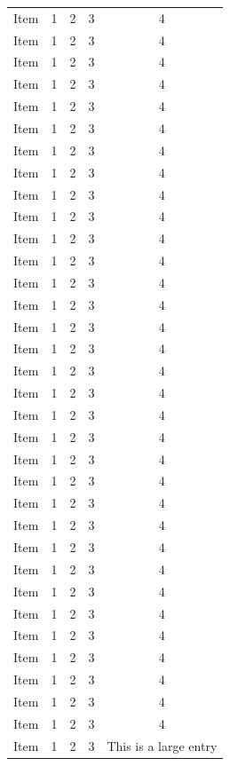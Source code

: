 \documentclass{article}
\begin{document}
\begin{longtable}[c]{|*{5}{c|}}
		Item & 1 & 2 & 3 & 4 \\
		Item & 1 & 2 & 3 & 4 \\
		Item & 1 & 2 & 3 & 4 \\
		Item & 1 & 2 & 3 & 4 \\
		Item & 1 & 2 & 3 & 4 \\
		Item & 1 & 2 & 3 & 4 \\
		Item & 1 & 2 & 3 & 4 \\
		Item & 1 & 2 & 3 & 4 \\
		Item & 1 & 2 & 3 & 4 \\
		Item & 1 & 2 & 3 & 4 \\
		Item & 1 & 2 & 3 & 4 \\
		Item & 1 & 2 & 3 & 4 \\
		Item & 1 & 2 & 3 & 4 \\
		Item & 1 & 2 & 3 & 4 \\
		Item & 1 & 2 & 3 & 4 \\
		Item & 1 & 2 & 3 & 4 \\
		Item & 1 & 2 & 3 & 4 \\
		Item & 1 & 2 & 3 & 4 \\
		Item & 1 & 2 & 3 & 4 \\
		Item & 1 & 2 & 3 & 4 \\
		Item & 1 & 2 & 3 & 4 \\
		Item & 1 & 2 & 3 & 4 \\
		Item & 1 & 2 & 3 & 4 \\
		Item & 1 & 2 & 3 & 4 \\
		Item & 1 & 2 & 3 & 4 \\
		Item & 1 & 2 & 3 & 4 \\
		Item & 1 & 2 & 3 & 4 \\
		Item & 1 & 2 & 3 & 4 \\
		Item & 1 & 2 & 3 & 4 \\
		Item & 1 & 2 & 3 & 4 \\
		Item & 1 & 2 & 3 & 4 \\
		Item & 1 & 2 & 3 & 4 \\
		Item & 1 & 2 & 3 & 4 \\
		Item & 1 & 2 & 3 & This is a large entry \\
	\end{longtable} 

	\bigskip
\end{document}

